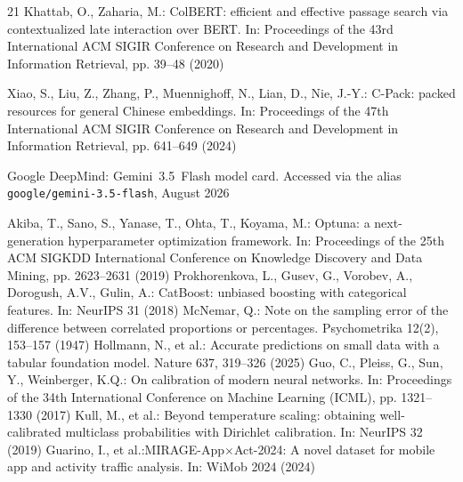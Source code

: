 \documentclass[runningheads]{llncs}
\begin{document}
\begin{thebibliography}{21}
Khattab, O., Zaharia, M.: ColBERT: efficient and effective passage search via contextualized late interaction over BERT. In: Proceedings of the 43rd International ACM SIGIR Conference on Research and Development in Information Retrieval, pp. 39--48 (2020)

Xiao, S., Liu, Z., Zhang, P., Muennighoff, N., Lian, D., Nie, J.-Y.: C-Pack: packed resources for general Chinese embeddings. In: Proceedings of the 47th International ACM SIGIR Conference on Research and Development in Information Retrieval, pp. 641--649 (2024)

Google DeepMind: Gemini~3.5~Flash model card. Accessed via the alias \texttt{google/gemini-3.5-flash}, August 2026

 Akiba, T., Sano, S., Yanase, T., Ohta, T., Koyama, M.: Optuna: a next-generation hyperparameter optimization framework. In: Proceedings of the 25th ACM SIGKDD International Conference on Knowledge Discovery and Data Mining, pp. 2623--2631 (2019)
 Prokhorenkova, L., Gusev, G., Vorobev, A., Dorogush, A.V., Gulin, A.: CatBoost: unbiased boosting with categorical features. In: NeurIPS 31 (2018)
 McNemar, Q.: Note on the sampling error of the difference between correlated proportions or percentages. Psychometrika 12(2), 153--157 (1947)
 Hollmann, N., et al.: Accurate predictions on small data with a tabular foundation model. Nature 637, 319--326 (2025)
 Guo, C., Pleiss, G., Sun, Y., Weinberger, K.Q.: On calibration of modern neural networks. In: Proceedings of the 34th International Conference on Machine Learning (ICML), pp. 1321--1330 (2017)
 Kull, M., et al.: Beyond temperature scaling: obtaining well-calibrated multiclass probabilities with Dirichlet calibration. In: NeurIPS 32 (2019)
 Guarino, I., et al.:MIRAGE-App$\times$Act-2024: A novel dataset for mobile app and activity traffic analysis. In: WiMob 2024 (2024)
\end{thebibliography}

\clearpage
\appendix



\end{document}
